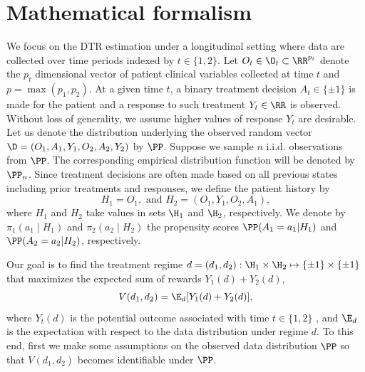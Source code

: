 \documentclass[preprint] {imsart}
\begin{document}
  
\section{Mathematical formalism}
\label{sec: DTR set-up}
We focus on the DTR estimation under a longitudinal setting where data are collected over time periods indexed by $t\in\{1,2\}$. Let $O_t\in\O_t \subset\RR^{p_t}$ denote the $p_t$ dimensional vector of patient clinical variables collected at time $t$ and $p=\max(p_1,p_2)$. At a given time $t$, a binary treatment decision $A_t\in\{\pm 1\}$ is made for the patient and a response to such treatment $Y_{t}\in\RR$ is observed.   Without loss of generality, we assume higher values of response $Y_{t}$ are desirable.  Let us denote the distribution underlying the observed random vector $\D = (O_1,A_1,Y_1,O_2,A_2,Y_2)$ by $\PP$. Suppose we sample $n$ i.i.d. observations from $\PP$. The corresponding empirical distribution function will be denoted by $\PP_n$.  Since treatment decisions are often made based on all previous states including prior treatments and responses, we define the patient history by
\[H_1=O_1,\mbox{ and }H_2=(O_1, Y_1, O_2, A_1),\]
where $H_1$ and $H_2$ take values in sets $\H_1$ and $\H_2$, respectively. 
We denote by $\pi_1(a_1\mid H_1)$ and $\pi_2(a_2\mid H_2)$  the propensity scores $\PP(A_1=a_1|H_1)$ and $\PP(A_2=a_2|H_2)$, respectively. 


Our goal is to find the treatment regime $d=(d_1,d_2): \H_1 \times \H_2 \mapsto \{\pm 1\}\times \{\pm 1\}$ that maximizes the expected sum of rewards $Y_1(d)+Y_2(d)$, $$V(d_1,d_2)=\E_d [Y_1(d)+Y_2(d)],$$ 
where $Y_t(d)$ is the potential outcome associated with time $t \in \{1,2\}$ , and $\E_d$ is the expectation with respect to the data distribution under regime $d$.  To this end, first we make some assumptions on the observed data distribution $\PP$ so that $V(d_1,d_2)$ becomes identifiable under $\PP$. 
\end{document}

